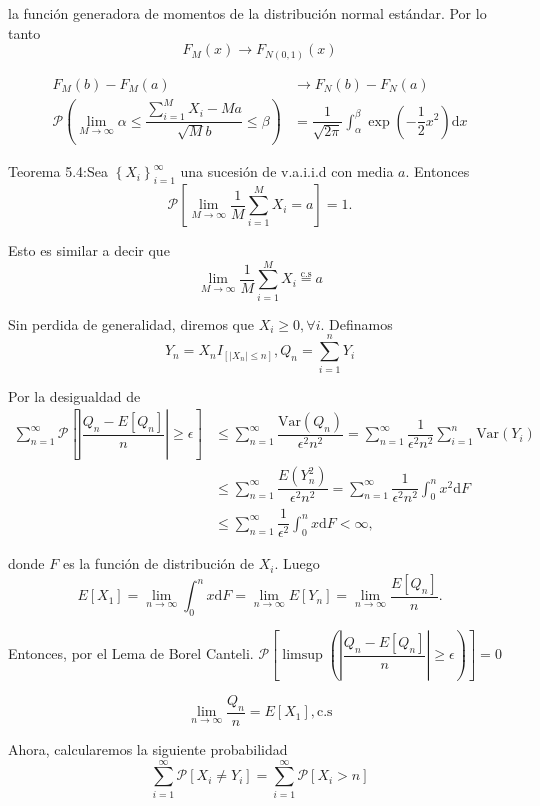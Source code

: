 \documentclass[
  letterpaper,
  DIV=11,
  numbers=noendperiod]{scrreprt}
\begin{document}
la función generadora de momentos de la distribución normal estándar.
Por lo tanto \[
F_{M}\left(x\right)\to F_{N\left(0,1\right)}\left(x\right)
\]

\begin{align*}
F_{M}\left(b\right)-F_{M}\left(a\right) & \to F_{N}\left(b\right)-F_{N}\left(a\right)\\
\mathcal{P}\left(\lim_{M\to\infty}\alpha\le\dfrac{{\displaystyle \sum_{i=1}^{M}}X_{i}-Ma}{\sqrt{M}b}\leq\beta\right) & =\dfrac{1}{\sqrt{2\pi}}\int_{\alpha}^{\beta}\exp\left(-\dfrac{1}{2}x^{2}\right)\mathrm{d}x
\end{align*}

Teorema 5.4:Sea \(\left\{ X_{i}\right\} _{i=1}^{\infty}\) una sucesión
de v.a.i.i.d con media \(a\). Entonces \[
\mathcal{P}\left[\lim_{M\to\infty}\dfrac{1}{M}\sum_{i=1}^{M}X_{i}=a\right]=1.
\]

Esto es similar a decir que \[
\lim_{M\to\infty}\dfrac{1}{M}\sum_{i=1}^{M}X_{i}\stackrel{\text{c.s}}{=}a
\]

Sin perdida de generalidad, diremos que \(X_{i}\geq0,\forall i\).
Definamos \[
Y_{n}=X_{n}I_{\left[\left|X_{n}\right|\leq n\right]},Q_{n}=\sum_{i=1}^{n}Y_{i}
\]

Por la desigualdad de \begin{align*}
\sum_{n=1}^{\infty}\mathcal{P}\left[\left|\dfrac{Q_{n}-E\left[Q_{n}\right]}{n}\right|\geq\epsilon\right] & \leq\sum_{n=1}^{\infty}\dfrac{\text{Var}\left(Q_{n}\right)}{\epsilon^{2}n^{2}}=\sum_{n=1}^{\infty}\dfrac{1}{\epsilon^{2}n^{2}}\sum_{i=1}^{n}\text{Var}\left(Y_{i}\right)\\
& \leq\sum_{n=1}^{\infty}\dfrac{E\left(Y_{n}^{2}\right)}{\epsilon^{2}n^{2}}=\sum_{n=1}^{\infty}\dfrac{1}{\epsilon^{2}n^{2}}\int_{0}^{n}x^{2}\mathrm{d}F\\
& \leq\sum_{n=1}^{\infty}\dfrac{1}{\epsilon^{2}}\int_{0}^{n}x\mathrm{d}F<\infty,
\end{align*}

donde \(F\) es la función de distribución de \(X_{i}\). Luego \[
E\left[X_{1}\right]=\lim_{n\to\infty}\int_{0}^{n}x\mathrm{d}F=\lim_{n\to\infty}E\left[Y_{n}\right]=\lim_{n\to\infty}\dfrac{E\left[Q_{n}\right]}{n}.
\]

Entonces, por el Lema de Borel Canteli.
\(\mathcal{\mathcal{P}}\left[\limsup\left(\left|\dfrac{Q_{n}-E\left[Q_{n}\right]}{n}\right|\geq\epsilon\right)\right]=0\)

\[
\lim_{n\to\infty}\dfrac{Q_{n}}{n}=E\left[X_{1}\right],\text{c.s}
\]

Ahora, calcularemos la siguiente probabilidad \[
\sum_{i=1}^{\infty}\mathcal{P}\left[X_{i}\neq Y_{i}\right]=\sum_{i=1}^{\infty}\mathcal{P}\left[X_{i}>n\right]
\]
\end{document}
